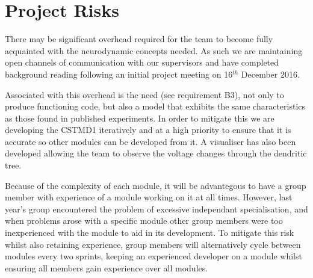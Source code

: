 \section{Project Risks} \label{projectrisks}

\par  There may be significant overhead required for the team to become fully acquainted with the neurodynamic concepts needed. As such we are maintaining open channels of communication with our supervisors and have completed background reading following an initial project meeting on 16$^{th}$ December 2016.

\par Associated with this overhead is the need (see requirement B3), not only to produce functioning code, but also a model that exhibits the same characteristics as those found in published experiments. In order to mitigate this we are developing the CSTMD1 iteratively and at a high priority to ensure that it is accurate so other modules can be developed from it. A visualiser has also been developed allowing the team to observe the voltage changes through the dendritic tree.

\par Because of the complexity of each module, it will be advantegous to have a group member with experience of a module working on it at all times. However, last year's group encountered the problem of excessive independant specialisation\cite{GITHUB2}, and when problems arose with a specific module other group members were too inexperienced with the module to aid in its development. To mitigate this risk whilst also retaining experience, group members will alternatively cycle between modules every two sprints, keeping an experienced developer on a module whilst ensuring all members gain experience over all modules.

\iffalse
\par Due to project aim to create a pseudo-realtime system there is an ongoing risk that one or more modules cannot operate at the required sample time. Given the feedback from the previous MSc project \cite{GITHUB2} it was seen that the CSTMD1 simulation acted as a bottleneck resulting in an end product that required manual batch data manipulation. During initial work optimisations have already been found in order to minimise the risk associated with computation time including but not limited to removing inefficiecies in the inter-module interactions.
\fi
